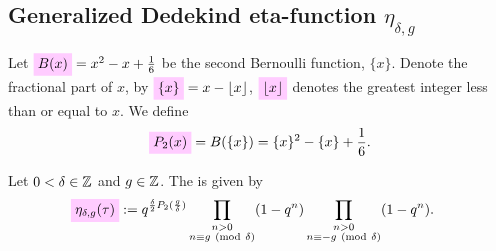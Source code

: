 \documentclass{article}
\begin{document}
\subsection{Generalized Dedekind eta-function $\eta_{\delta,g}$}

Let $\defineNotation[B]{B(x)} = x^2 - x + \frac{1}{6}$
be the second Bernoulli function, $\{x\}$.
%
Denote the fractional part of $x$, by
$\defineNotation[x-fractional]{\{x\}} = x - \lfloor x \rfloor$,
$\defineNotation[x-floor]{\lfloor x \rfloor}$ denotes the greatest
integer less than or equal to $x$.
We define
\begin{gather}
    \defineNotation[P-2]{P_2(x)} = B(\{x\}) = \{x\}^2 - \{x\} + \frac{1}{6}.
    \label{eq:P-2}
\end{gather}

\begin{Definition}
\label{def:eta_delta-g^[R](tau)}
\cite{Robins_GeneralizedDedekindEtaProducts_1994}
%
Let $0<\delta\in\mathbb{Z}$ and $g\in\mathbb{Z}$.
%
The  is given by
\begin{align}
  \defineNotation[eta-delta-g-tau-Robins]{\eta_{\delta,g}(\tau)}
  &:=
  q^{\frac{\delta}{2}P_2(\frac{g}{\delta})}
  \prod_{\substack{n>0\\n\equiv g\ (\mathrm{mod}\ \delta)}} (1-q^n)
  \prod_{\substack{n>0\\n\equiv -g\ (\mathrm{mod}\ \delta)}} (1-q^n).
  \label{eq:eta_delta-g^[R](tau)-mod}
\end{align}

\end{Definition}
\end{document}
